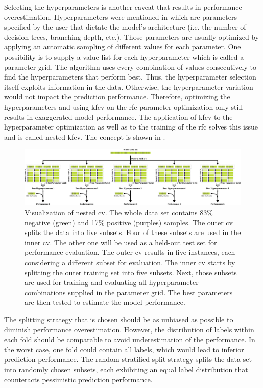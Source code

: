 Selecting the hyperparameters is another caveat that results in performance overestimation. Hyperparameters were mentioned in  which are parameters specified by the user that dictate the model's architecture (i.e. the number of decision trees, branching depth, etc.). Those parameters are usually optimized by applying an automatic sampling of different values for each parameter. One possibility is to supply a value list for each hyperparameter which is called a parameter grid. The algorithm uses every combination of values consecutively to find the hyperparameters that perform best. Thus, the hyperparameter selection itself exploits information in the data. Otherwise, the hyperparameter variation would not impact the prediction performance. Therefore, optimizing the hyperparameters and using \ac{kfcv} on the \ac{rfc} parameter optimization only still results in exaggerated model performance. The application of \ac{kfcv} to the hyperparameter optimization as well as to the training of the \ac{rfc} solves this issue and is called nested \ac{kfcv}. The concept is shown in .\cite{Raschka2018}
\begin{figure}[H]
	\centering
	\includegraphics[width=\textwidth]{figures/nested_cv_visualization.pdf}
	\caption[Visualization of Nested \ac{cv}]{Visualization of nested \ac{cv}. The whole data set contains 83\% negative (green) and 17\% positive (purples) samples. The outer \ac{cv} splits the data into five subsets. Four of these subsets are used in the inner \ac{cv}. The other one will be used as a held-out test set for performance evaluation. The outer \ac{cv} results in five instances, each considering a different subset for evaluation. The inner \ac{cv} starts by splitting the outer training set into five subsets. Next, those subsets are used for training and evaluating all hyperparameter combinations supplied in the parameter grid. The best parameters are then tested to estimate the model performance.}
	\label{fig:nestedcv}
\end{figure}
The splitting strategy that is chosen should be as unbiased as possible to diminish performance overestimation. However, the distribution of labels within each fold should be comparable to avoid underestimation of the performance. In the worst case, one fold could contain all labels, which would lead to inferior prediction performance. The random-stratified-split-strategy splits the data set into randomly chosen subsets, each exhibiting an equal label distribution that counteracts pessimistic prediction performance.\cite{Kohavi1995}
%
%
